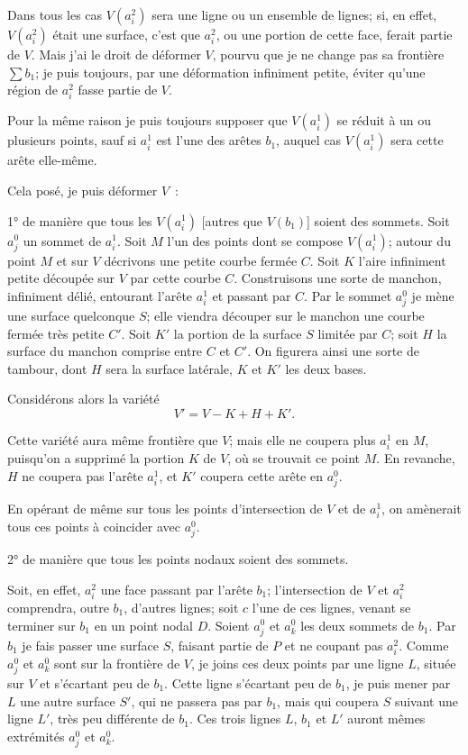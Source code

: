 \documentclass{article}
\begin{document}
Dans tous les cas $V(a^{2}_{i})$ sera une ligne ou un ensemble de lignes; si, en effet, $V(a^{2}_{i})$ était une surface, c'est que $a^{2}_{i}$, ou une portion de cette face, ferait partie de $V$. Mais j'ai le droit de déformer $V$, pourvu que je ne change pas sa frontière $\displaystyle\sum b_{1}$; je puis toujours, par une déformation infiniment petite, éviter qu'une région de $a^{2}_{i}$ fasse partie de $V$.

Pour la même raison je puis toujours supposer que $V(a^{1}_{i})$ se réduit à un ou plusieurs points, sauf si $a^{1}_{i}$ est l'une des arêtes $b_{1}$, auquel cas $V(a^{1}_{i})$ sera cette arête elle-même.

Cela posé, je puis déformer $V$~:

1° de manière que tous les $V(a^{1}_{i})$ [autres que $V(b_{1})$] soient des sommets. Soit $a^{0}_{j}$ un sommet de $a^{1}_{i}$. Soit $M$ l'un des points dont se compose $V(a^{1}_{i})$; autour du point $M$ et sur $V$ décrivons une petite courbe fermée $C$. Soit $K$ l'aire infiniment petite découpée sur $V$ par cette courbe $C$. Construisons une sorte de manchon, infiniment délié, entourant l'arête $a^{1}_{i}$ et passant par $C$. Par le sommet $a^{0}_{j}$ je mène une surface quelconque $S$; elle viendra découper sur le manchon une courbe fermée très petite $C'$. Soit $K'$ la portion de la surface $S$ limitée par $C$; soit $H$ la surface du manchon comprise entre $C$ et $C'$. On figurera ainsi une sorte de tambour, dont $H$ sera la surface latérale, $K$ et $K'$ les deux bases.

Considérons alors la variété
\[ V' = V - K + H + K'. \]

Cette variété aura même frontière que $V$; mais elle ne coupera plus $a^{1}_{i}$ en $M$, puisqu'on a supprimé la portion $K$ de $V$, où se trouvait ce point $M$. En revanche, $H$ ne coupera pas l'arête $a^{1}_{i}$, et $K'$ coupera cette arête en $a^{0}_{j}$.


En opérant de même sur tous les points d'intersection de $V$ et de $a^{1}_{i}$, on amènerait tous ces points à coincider avec $a^{0}_{j}$.

2° de manière que tous les points nodaux soient des sommets.

Soit, en effet, $a^{2}_{i}$ une face passant par l'arête $b_{1}$; l'intersection de $V$ et $a^{2}_{i}$ comprendra, outre $b_{1}$, d'autres lignes; soit $c$ l'une de ces lignes, venant se terminer sur $b_{1}$ en un point nodal $D$. Soient $a^{0}_{j}$ et $a^{0}_{k}$ les deux sommets de $b_{1}$. Par $b_{1}$ je fais passer une surface $S$, faisant partie de $P$ et ne coupant pas $a^{2}_{i}$. Comme $a^{0}_{j}$ et $a^{0}_{k}$ sont sur la frontière de $V$, je joins ces deux points par une ligne $L$, située sur $V$ et s'écartant peu de $b_{1}$. Cette ligne s'écartant peu de $b_{1}$, je puis mener par $L$ une autre surface $S'$, qui ne passera pas par $b_{1}$, mais qui coupera $S$ suivant une ligne $L'$, très peu différente de $b_{1}$. Ces trois lignes $L$, $b_{1}$ et $L'$ auront mêmes extrémités $a^{0}_{j}$ et $a^{0}_{k}$.
\end{document}
